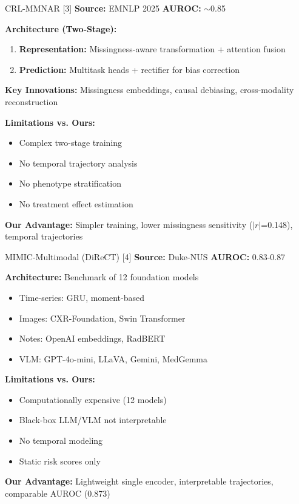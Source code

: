 \documentclass[11pt,a4paper]{article}
\begin{document}
\vspace{0.3cm}

\begin{competitorbox}{CRL-MMNAR [3]}
\textbf{Source:} EMNLP 2025 \hfill \textbf{AUROC:} $\sim$0.85

\textbf{Architecture (Two-Stage):}
\begin{enumerate}[nosep,leftmargin=1em]
    \item \textbf{Representation:} Missingness-aware transformation + attention fusion
    \item \textbf{Prediction:} Multitask heads + rectifier for bias correction
\end{enumerate}

\textbf{Key Innovations:} Missingness embeddings, causal debiasing, cross-modality reconstruction

\textbf{Limitations vs. Ours:}
\begin{itemize}[nosep,leftmargin=1em]
    \item Complex two-stage training
    \item No temporal trajectory analysis
    \item No phenotype stratification
    \item No treatment effect estimation
\end{itemize}

\textbf{Our Advantage:} Simpler training, lower missingness sensitivity ($|r|$=0.148), temporal trajectories
\end{competitorbox}

\vspace{0.3cm}

\begin{competitorbox}{MIMIC-Multimodal (DiReCT) [4]}
\textbf{Source:} Duke-NUS \hfill \textbf{AUROC:} 0.83-0.87

\textbf{Architecture:} Benchmark of 12 foundation models
\begin{itemize}[nosep,leftmargin=1em]
    \item Time-series: GRU, moment-based
    \item Images: CXR-Foundation, Swin Transformer
    \item Notes: OpenAI embeddings, RadBERT
    \item VLM: GPT-4o-mini, LLaVA, Gemini, MedGemma
\end{itemize}

\textbf{Limitations vs. Ours:}
\begin{itemize}[nosep,leftmargin=1em]
    \item Computationally expensive (12 models)
    \item Black-box LLM/VLM not interpretable
    \item No temporal modeling
    \item Static risk scores only
\end{itemize}

\textbf{Our Advantage:} Lightweight single encoder, interpretable trajectories, comparable AUROC (0.873)
\end{competitorbox}
\end{document}
